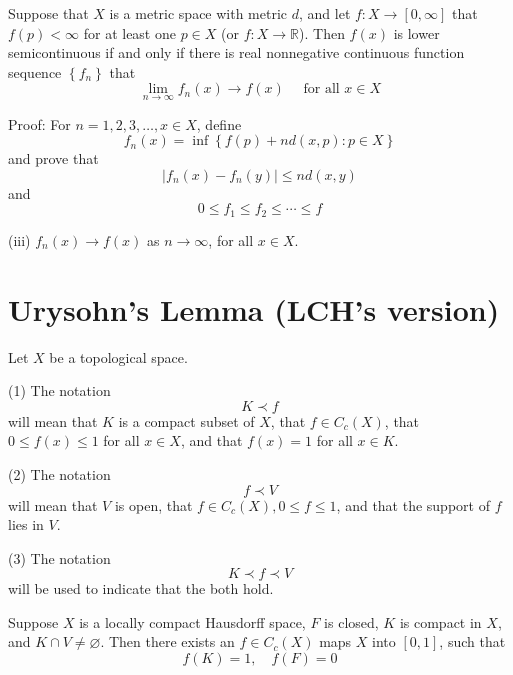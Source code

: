 \documentclass[12pt, a4paper, oneside]{book}
\begin{document}
\begin{theorem}
    Suppose that $X$ is a metric space with metric $d$, and let $f: X \longrightarrow[0, \infty]$ that $f(p)<\infty$ for at least one $p \in X$
    (or $f : X\longrightarrow \mathbb{R}$). Then $f(x)$ is lower semicontinuous if and only if there is real nonnegative continuous function sequence
    $\left\{f_n\right\}$ that
    $$\lim_{n \to \infty} f_n (x) \rightarrow f(x) \quad \text{ for all } x \in X$$

    Proof:
    For $n=1,2,3, \ldots, x \in X$, define
    $$f_{n}(x)=\inf \left\{f(p)+n d(x, p): p \in X\right\}$$
    and prove that
    $$\left|f_{n}(x)-f_{n}(y)\right| \leq n d(x, y)$$
    and
    $$0 \leq f_{1} \leq f_{2} \leq \cdots \leq f$$

    (iii) $f_{n}(x) \rightarrow f(x)$ as $n \rightarrow \infty$, for all $x \in X$.
\end{theorem}

\section{Urysohn's Lemma (LCH's version)}
\begin{definition}
    Let $X$ be a topological space.

    (1) The notation
    $$ K \prec f$$
    will mean that $K$ is a compact subset of $X$, that $f \in C_c(X)$, that $0 \leq f(x) \leq 1$ for all $x \in X$, and that $f(x)=1$ for all $x \in K$.

    (2) The notation
    $$f \prec V$$
    will mean that $V$ is open, that $f \in C_c(X), 0 \leq f \leq 1$, and that the support of $f$ lies in $V$.

    (3) The notation
    $$K \prec f \prec V$$
    will be used to indicate that the both hold.
\end{definition}

\begin{theorem}
    \label{thm: Urysohn's Lemma}
    Suppose $X$ is a locally compact Hausdorff space, $F$ is closed, $K$ is compact in $X$, and $K \cap V\neq \varnothing$. Then there exists an $f \in C_c(X)$ maps $X$ into $[0,1]$, such that
    \begin{equation*}
        f(K)=1 ,\quad f(F) =0
    \end{equation*}
\end{theorem}
\end{document}
